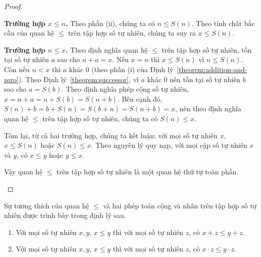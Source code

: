 \begin{proof}
\begin{enumerate}[label={(\roman*)}]
              \textbf{Trường hợp $x\leq n$.} Theo phần (ii), chúng ta có $n\leq S(n)$. Theo tính chất bắc cầu của quan hệ $\leq$ trên tập hợp số tự nhiên, chúng ta suy ra $x\leq S(n)$.

              \textbf{Trường hợp $n\leq x$.} Theo định nghĩa quan hệ $\leq$ trên tập hợp số tự nhiên, tồn tại số tự nhiên $a$ sao cho $n + a = x$. Nếu $x = n$ thì $x\leq S(n)$ vì $n\leq S(n)$. Còn nếu $n < x$ thì $a$ khác $0$ (theo phần (i) của Định lý~\ref{theorem:addition-and-zero}). Theo Định lý~\ref{theorem:successor}, vì $a$ khác $0$ nên tồn tại số tự nhiên $b$ sao cho $a = S(b)$. Theo định nghĩa phép cộng số tự nhiên, $x = n + a = n + S(b) = S(n + b)$. Bên cạnh đó, $S(n) + b = b + S(n) = S(b + n) = S(n + b) = x$, nên theo định nghĩa quan hệ $\leq$ trên tập hợp số tự nhiên, chúng ta có $S(n)\leq x$.

              Tóm lại, từ cả hai trường hợp, chúng ta kết luận: với mọi số tự nhiên $x$, $x\leq S(n)$ hoặc $S(n)\leq x$. Theo nguyên lý quy nạp, với mọi cặp số tự nhiên $x$ và $y$, có $x\leq y$ hoặc $y\leq x$.

              Vậy quan hệ $\leq$ trên tập hợp số tự nhiên là một quan hệ thứ tự toàn phần.\qedhere
    \end{enumerate}
\end{proof}

Sự tương thích của quan hệ $\leq$ và hai phép toán cộng và nhân trên tập hợp số tự nhiên được trình bày trong định lý sau.
\begin{theorem}\label{theorem:natural-numbers-order}
    \begin{enumerate}[label={(\roman*)}]
        \item Với mọi số tự nhiên $x, y$, $x\leq y$ thì với mọi số tự nhiên $z$, có $x + z\leq y + z$.
        \item Với mọi số tự nhiên $x, y$, $x\leq y$ thì với mọi số tự nhiên $z$, có $x\cdot z\leq y\cdot z$.
    \end{enumerate}
\end{theorem}

